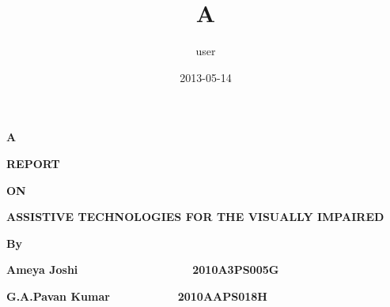 
\usepackage[ascii]{inputenc}
\usepackage[T1]{fontenc}
\usepackage[english]{babel}
\usepackage{amsmath}
\usepackage{amssymb,amsfonts,textcomp}
\usepackage{color}
\usepackage{array}
\usepackage{hhline}
\usepackage{hyperref}

\hypersetup{pdftex, colorlinks=true, linkcolor=blue, citecolor=blue, filecolor=blue, urlcolor=blue, pdftitle=A, pdfauthor=user, pdfsubject=, pdfkeywords=}

\setlength\voffset{-1in}
\setlength\hoffset{-1in}
\setlength\topmargin{2.54cm}
\setlength\oddsidemargin{3.175cm}
\setlength\textheight{22.86cm}
\setlength\textwidth{15.240001cm}
\setlength\footskip{0.0cm}
\setlength\headheight{0cm}
\setlength\headsep{0cm}
\setlength{\skip\footins}{0.119cm}
\renewcommand\footnoterule{\vspace*{-0.018cm}\setlength\leftskip{0pt}\setlength\rightskip{0pt plus 1fil}\noindent\textcolor{black}{\rule{0.25\columnwidth}{0.018cm}}\vspace*{0.101cm}}
\makeatletter
\newcommand\ps@Standard{
  \renewcommand\@oddhead{}
  \renewcommand\@evenhead{}
  \renewcommand\@oddfoot{}
  \renewcommand\@evenfoot{}
  \renewcommand\thepage{\arabic{page}}
}
\makeatother
\pagestyle{Standard}
\title{A}
\author{user}
\date{2013-05-14}

\clearpage\setcounter{page}{1}\pagestyle{Standard}
{\centering {}\bfseries
A
\par}

{\centering{}\bfseries
REPORT
\par}

{\centering{}\bfseries
ON
\par}


\bigskip
{\centering{}\bfseries
ASSISTIVE TECHNOLOGIES FOR THE VISUALLY IMPAIRED
\par}

\bigskip


\bigskip

{\centering{}\bfseries
By
\par}


\bigskip

{\centering{}\bfseries
Ameya Joshi\ \ \ \ \ \ \ \ \ \ \ \ \ \  \  \ \ \ 2010A3PS005G
\par}
{\centering{}\bfseries
G.A.Pavan Kumar \ \ \ \ \ \ \ \ \ \ 2010AAPS018H
\par}


